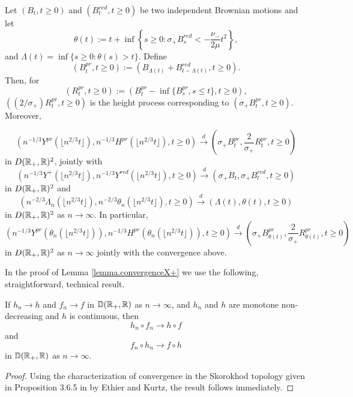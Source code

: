 \begin{lemma}\label{lemma.convergenceX+}
Let $(B_t, t \geq 0)$ and $(B^{red}_t, t\geq 0)$ be two independent Brownian motions and let $$\theta(t):=t+\inf\left\{s\geq 0 : \sigma_+ B^{red}_s< -\frac{\nu_-}{2\mu} t^2\right\},$$ and $\Lambda(t)=\inf\{s\geq 0:\theta(s)> t\}$. Define \begin{equation}\label{eq.definitionBpr}\left(B^{pr}_t,t \geq 0\right):=\left( B_{\Lambda(t)}+ B^{red}_{t-\Lambda(t)}, t\geq 0\right).\end{equation}
Then, for $$(R^{pr}_t, t\geq 0):=\left(B^{pr}_t-\inf\{B^{pr}_s,s\leq t\},t\geq 0\right),$$
$\left((2/\sigma_+)R^{pr}_t, t\geq 0\right)$
is the height process corresponding to $\left(\sigma_+ B^{pr}_t,t \geq 0\right)$.
Moreover,

\begin{equation}\label{eq.convergenceYpr} \left(n^{-1/3}Y^{pr}\left( \lfloor n^{2/3}t \rfloor \right), n^{-1/3}H^{pr}\left( \lfloor n^{2/3}t \rfloor \right),t\geq 0\right)\overset{d}{\to}\left( \sigma_+ B^{pr}_{t} ,\frac{2}{\sigma_+}R^{pr}_t, t\geq 0\right)\end{equation}
in $D({\mathbb R}_+,{\mathbb R})^2$, jointly with 
$$\left(n^{-1/3}Y^+\left(\lfloor n^{2/3}t \rfloor \right), n^{-1/3}Y^{red}\left(\lfloor n^{2/3}t \rfloor \right), t\geq 0\right) \overset{d}{\to}\left(\sigma_+ B_t,\sigma_+ B^{red}_t, t\geq 0\right)$$
in $D({\mathbb R}_+,{\mathbb R})^2$ and 
$$\left(n^{-2/3} \Lambda_n\left(\lfloor n^{2/3}t\rfloor \right), n^{-2/3}\theta_n\left(\lfloor n^{2/3}t\rfloor \right),t\geq 0\right)\overset{d}{\to}\left(\Lambda(t),\theta(t), t\geq 0 \right)$$
in $D({\mathbb R}_+,{\mathbb R})^2$ as $n\to \infty$. 
In particular, 
\begin{equation}\label{eq.convergencecompSprandtheta}\left(n^{-1/3}Y^{pr}\left(\theta_n \left(\lfloor n^{2/3}t\rfloor \right)\right), n^{-1/3}H^{pr}\left(\theta_n\left(\lfloor n^{2/3}t\rfloor \right) \right),t\geq 0 \right) \overset{d}{\to} \left(\sigma_+ B^{pr}_{\theta(t)}, \frac{2}{\sigma_+}R^{pr}_{\theta(t)},t\geq 0\right)\end{equation}
in $D({\mathbb R}_+,{\mathbb R})^2$ as $n\to \infty$ jointly with the convergence above.
\end{lemma}
In the proof of Lemma \ref{lemma.convergenceX+} we use the following, straightforward, technical result. 

\begin{lemma}\label{lemma.technicalcomposedfunctions}
If $h_n\to h$ and $f_n\to f$ in ${\mathbb D}({\mathbb R}_+,{\mathbb R})$ as $n\to\infty$, and $h_n$ and $h$ are monotone non-decreasing and $h$ is continuous, then 
$$h_n\circ f_n \to h\circ f$$
and 
$$f_n\circ h_n \to f\circ h$$
in ${\mathbb D}({\mathbb R}_+,{\mathbb R})$ as $n\to\infty$.
\end{lemma}
\begin{proof}
Using the characterization of convergence in the Skorokhod topology given in Proposition 3.6.5 in \cite{ethierMarkovProcessesCharacterization1986} by Ethier and Kurtz, the result follows immediately.
\end{proof}


